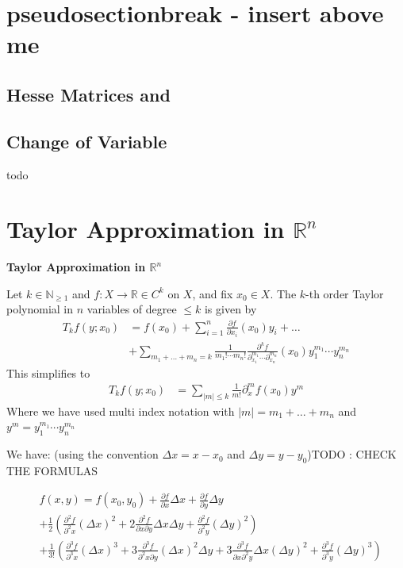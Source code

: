 \documentclass[25pt]{sciposter}
\newcommand{\R}{\mathbb{R}}
\newcommand{\N}{\mathbb{N}}
\newenvironment{method}[1]{\begin{mdframed}[backgroundcolor=blue!10,innertopmargin=15pt, innerbottommargin=15pt, nobreak=true]
		\textbf{#1 }
	}
	{ 
	\end{mdframed}
}
\begin{document}
\begin{multicols}{3}
\section{pseudosectionbreak - insert above me}




\subsection{Hesse Matrices and }


\subsection{Change of Variable}


todo



\section*{Taylor Approximation in $\R^n$}


\begin{method}{Taylor Approximation in $\R^n$}
	Let $k\in \N_{\geq 1}$ and $f:X \to \R  \in C^k$ on $X$, and fix $x_0 \in X$. The $k$-th order Taylor polynomial in $n$ variables of degree $\leq k$ is given by
	\begin{align*}
		T_k f(y;x_0) &= f(x_0) + \sum_{i=1}^{n} \frac{\partial f}{\partial x_i} (x_0) y_i + \ldots \\ & + \sum_{m_1 + \ldots + m_n = k}  \frac{1}{m_1 ! \cdots m_n !} \frac{\partial ^k f}{\partial_{x_1}^{m_1} \cdots \partial_{x_n}^{m_n} } (x_0) y_{1}^{m_1} \cdots y_{n}^{m_n}
	\end{align*}
	This simplifies to
	\begin{align*}
		T_{k} f(y;x_0) &= \sum_{|m|\leq k} \frac{1}{m!} \partial^{m}_{x} f(x_0) y^m
	\end{align*}
	Where we have used multi index notation with $|m| = m_1 + \ldots + m_n$ and $y^m = y_{1}^{m_1} \cdots y_{n}^{m_n}$
	
\end{method}


We have: (using the convention $\Delta x = x-x_0$ and $\Delta y = y-y_0$)TODO : CHECK THE FORMULAS

\begin{align*}
	&f(x,y) = f(x_0,y_0) + \frac{\partial f}{\partial x} \Delta x + \frac{\partial f}{\partial y} \Delta y\\
	&+ \frac{1}{2}\left(  \frac{\partial^2 f}{\partial^2 x} (\Delta x)^2  +  2\frac{\partial^2 f}{\partial x \partial y} \Delta x \Delta y +     \frac{\partial^2 f}{\partial^2 y} (\Delta y)^2   \right)\\
	&+ \frac{1}{3!}\left(    \frac{\partial^3 f}{\partial^3 x} (\Delta x)^3    + 3\frac{\partial^3 f}{\partial^2 x \partial y } (\Delta x)^2 \Delta y  +3\frac{\partial^3 f}{\partial x \partial^2 y } \Delta x (\Delta y)^2 +  \frac{\partial^3 f}{\partial^3 y} (\Delta y)^3 \right) 
\end{align*}


\end{multicols}
\end{document}
